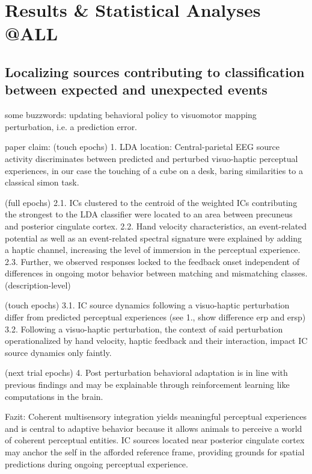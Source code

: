 \section{Results \& Statistical Analyses @ALL}

\subsection{Localizing sources contributing to classification between expected and unexpected events}

some buzzwords:
updating behavioral policy to 
visuomotor mapping
perturbation, i.e. a prediction error.

paper claim:
(touch epochs)
1. LDA location: Central-parietal EEG source activity discriminates between predicted and perturbed visuo-haptic perceptual experiences, in our case the touching of a cube on a desk, baring similarities to a classical simon task.

(full epochs)
2.1. ICs clustered to the centroid of the weighted ICs contributing the strongest to the LDA classifier were located to an area between precuneus and posterior cingulate cortex.
2.2. Hand velocity characteristics, an event-related potential as well as an event-related spectral signature were explained by adding a haptic channel, increasing the level of immersion in the perceptual experience.
2.3. Further, we observed responses locked to the feedback onset independent of differences in ongoing motor behavior between matching and mismatching classes. (description-level)

(touch epochs)
3.1. IC source dynamics following a visuo-haptic perturbation differ from predicted perceptual experiences (see 1., show difference erp and ersp)
3.2. Following a visuo-haptic perturbation, the context of said perturbation operationalized by hand velocity, haptic feedback and their interaction, impact IC source dynamics only faintly.

(next trial epochs)
4. Post perturbation behavioral adaptation is in line with previous findings and may be explainable through reinforcement learning like computations in the brain.

Fazit:
Coherent multisensory integration yields meaningful perceptual experiences and is central to adaptive behavior because it allows animals to perceive a world of coherent perceptual entities. IC sources located near posterior cingulate cortex may anchor the self in the afforded reference frame, providing grounds for spatial predictions during ongoing perceptual experience.

